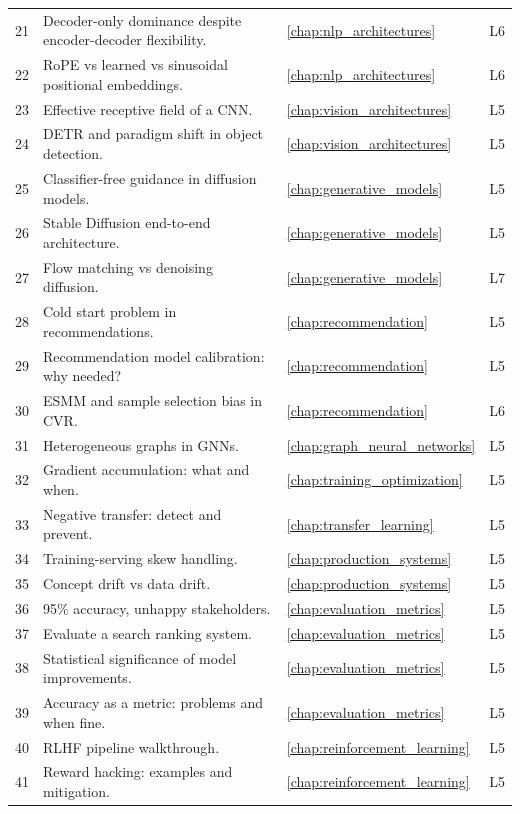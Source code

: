 \begin{longtable}{rp{8.5cm}ll}
21 & Decoder-only dominance despite encoder-decoder flexibility. & \ref{chap:nlp_architectures} & L6 \\
22 & RoPE vs learned vs sinusoidal positional embeddings. & \ref{chap:nlp_architectures} & L6 \\
23 & Effective receptive field of a CNN. & \ref{chap:vision_architectures} & L5 \\
24 & DETR and paradigm shift in object detection. & \ref{chap:vision_architectures} & L5 \\
25 & Classifier-free guidance in diffusion models. & \ref{chap:generative_models} & L5 \\
26 & Stable Diffusion end-to-end architecture. & \ref{chap:generative_models} & L5 \\
27 & Flow matching vs denoising diffusion. & \ref{chap:generative_models} & L7 \\
28 & Cold start problem in recommendations. & \ref{chap:recommendation} & L5 \\
29 & Recommendation model calibration: why needed? & \ref{chap:recommendation} & L5 \\
30 & ESMM and sample selection bias in CVR. & \ref{chap:recommendation} & L6 \\
31 & Heterogeneous graphs in GNNs. & \ref{chap:graph_neural_networks} & L5 \\
32 & Gradient accumulation: what and when. & \ref{chap:training_optimization} & L5 \\
33 & Negative transfer: detect and prevent. & \ref{chap:transfer_learning} & L5 \\
34 & Training-serving skew handling. & \ref{chap:production_systems} & L5 \\
35 & Concept drift vs data drift. & \ref{chap:production_systems} & L5 \\
36 & 95\% accuracy, unhappy stakeholders. & \ref{chap:evaluation_metrics} & L5 \\
37 & Evaluate a search ranking system. & \ref{chap:evaluation_metrics} & L5 \\
38 & Statistical significance of model improvements. & \ref{chap:evaluation_metrics} & L5 \\
39 & Accuracy as a metric: problems and when fine. & \ref{chap:evaluation_metrics} & L5 \\
40 & RLHF pipeline walkthrough. & \ref{chap:reinforcement_learning} & L5 \\
41 & Reward hacking: examples and mitigation. & \ref{chap:reinforcement_learning} & L5 \\

\end{longtable}
